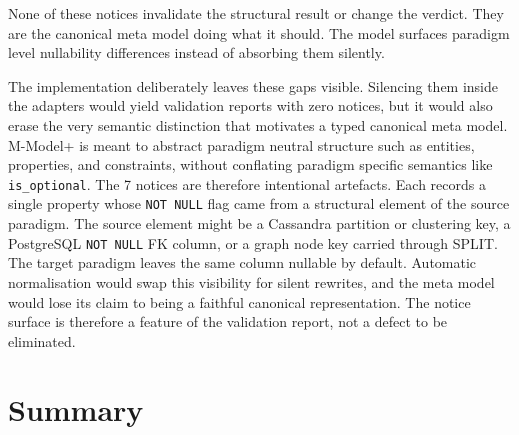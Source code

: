   None of these notices invalidate the structural result or change
  the verdict. They are the canonical meta model doing what it should.
  The model surfaces paradigm level nullability differences instead
  of absorbing them silently.

  The implementation deliberately leaves these gaps visible. Silencing
  them inside the adapters would yield validation reports with zero
  notices, but it would also erase the very semantic distinction that
  motivates a typed canonical meta model. M-Model+ is meant to
  abstract paradigm neutral structure such as entities, properties,
  and constraints, without conflating paradigm specific semantics like
  \texttt{is\_optional}. The 7 notices are therefore intentional
  artefacts. Each records a single property whose \texttt{NOT NULL}
  flag came from a structural element of the source paradigm. The
  source element might be a Cassandra partition or clustering key, a
  PostgreSQL \texttt{NOT NULL} FK column, or a graph node key carried
  through SPLIT. The target paradigm leaves the same column nullable
  by default.
  Automatic normalisation would swap this visibility for silent
  rewrites, and the meta model would lose its claim to being a
  faithful canonical representation. The notice surface is therefore a
  feature of the validation report, not a defect to be eliminated.
  \section{Summary}\label{sec:eval-summary}

